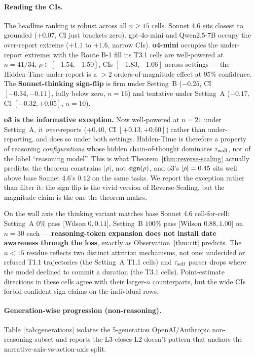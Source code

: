 \paragraph{Reading the CIs.}
The headline ranking is robust across all $n{\geq}15$ cells. Sonnet 4.6 sits closest to grounded ($+0.07$, CI just brackets zero). gpt-4o-mini and Qwen2.5-7B occupy the over-report extreme ($+1.1$ to $+1.6$, narrow CIs). \textbf{o4-mini} occupies the under-report extreme: with the Route B-1 fill its T3.1 cells are well-powered at $n{=}41/34$, $\rho \in [-1.54,-1.50]$, CIs $[-1.83,-1.06]$ across settings --- the Hidden-Time under-report is a $>2$ orders-of-magnitude effect at $95\%$ confidence. The \textbf{Sonnet-thinking sign-flip} is firm under Setting~B ($-0.25$, CI $[-0.34,-0.11]$, fully below zero, $n{=}16$) and tentative under Setting~A ($-0.17$, CI $[-0.32,+0.05]$, $n{=}10$).

\textbf{o3 is the informative exception.} Now well-powered at $n{=}21$ under Setting~A, it \emph{over}-reports ($+0.40$, CI $[+0.13,+0.60]$) rather than under-reporting, and does so under both settings. Hidden-Time is therefore a property of reasoning \emph{configurations} whose hidden chain-of-thought dominates $\tau_{\mathrm{wall}}$, not of the label ``reasoning model''. This is what Theorem~\ref{thm:reverse-scaling} actually predicts: the theorem constrains $|\rho|$, not $\mathrm{sign}(\rho)$, and o3's $|\rho| = 0.45$ sits well above base Sonnet 4.6's $0.12$ on the same tasks. We report the exception rather than filter it: the sign flip is the vivid version of Reverse-Scaling, but the magnitude claim is the one the theorem makes.

On the wall axis the thinking variant matches base Sonnet 4.6 cell-for-cell: Setting~A $0\%$ pass [Wilson $0,0.11$], Setting~B $100\%$ pass [Wilson $0.88,1.00$] on $n{=}30$ each --- \textbf{reasoning-token expansion does not install date awareness through the loss}, exactly as Observation~\ref{thm:cit} predicts. The $n{<}15$ residue reflects two distinct attrition mechanisms, not one: undecided or refused T1.1 trajectories (the Setting~A T1.1 cells) and $\tau_{\mathrm{self}}$ parser drops where the model declined to commit a duration (the T3.1 cells). Point-estimate directions in these cells agree with their larger-$n$ counterparts, but the wide CIs forbid confident sign claims on the individual rows.

\paragraph{Generation-wise progression (non-reasoning).}
Table~\ref{tab:generations} isolates the 5-generation OpenAI/Anthropic non-reasoning subset and reports the L3-closes-L2-doesn't pattern that anchors the narrative-axis-vs-action-axis split.

